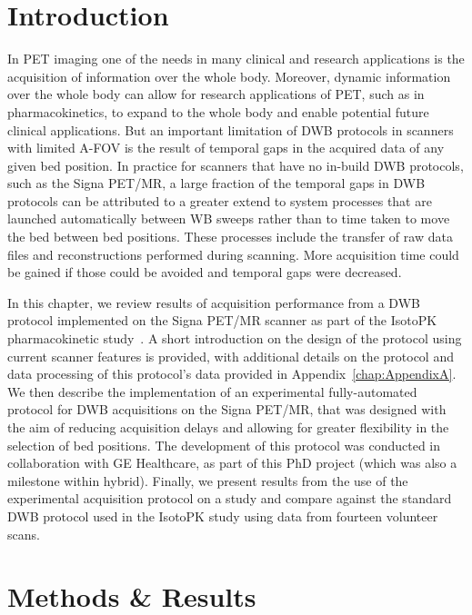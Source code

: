 \section{Introduction}
In PET imaging one of the needs in many clinical and research applications is the acquisition of information over the whole body. Moreover, dynamic information over the whole body can allow for research applications of PET, such as in pharmacokinetics, to expand to the whole body and enable potential future clinical applications. 
But an important limitation of DWB protocols in scanners with limited A-FOV is the result of temporal gaps in the acquired data of any given bed position.
In practice for scanners that have no in-build DWB protocols, such as the Signa PET/MR, a large fraction of the temporal gaps in DWB protocols can be attributed to a greater extend to system processes that are launched automatically between WB sweeps rather than to time taken to move the bed between bed positions. These processes include the transfer of raw data files and reconstructions performed during scanning. More acquisition time could be gained if those could be avoided and temporal gaps were decreased.

In this chapter, we review results of acquisition performance from a DWB protocol implemented on the Signa PET/MR scanner as part of the IsotoPK pharmacokinetic study~\cite{Marie2019}. A short introduction on the design of the protocol using current scanner features is provided, with additional details on the protocol and data processing of this protocol's data provided in Appendix~\ref{chap:AppendixA}.
We then describe the implementation of an experimental fully-automated protocol for DWB acquisitions on the Signa PET/MR, that was designed with the aim of reducing acquisition delays and allowing for greater flexibility in the selection of bed positions. The development of this protocol was conducted in collaboration with GE Healthcare, as part of this PhD project (which was also a milestone within \gls{hybrid}). 
Finally, we present results from the use of the experimental acquisition protocol on a  study and compare against the standard DWB protocol used in the IsotoPK study using data from fourteen volunteer scans.

\section{Methods \& Results}

